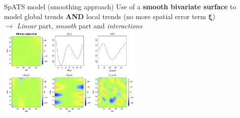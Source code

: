 \documentclass[]{beamer}
\begin{document}
\begin{frame}{SpATS model (smoothing approach)}
Use of a \textbf{smooth bivariate surface} to model global trends \textbf{AND} local trends (no more spatial error term
$\boldsymbol{\xi}$)\\

$\rightarrow$ \emph{Linear} part, \emph{smooth} part and \emph{interactions}\\

\centering
\includegraphics[height = 4.5cm]{Pictures/smoothing.PNG}
\end{frame}
\end{document}
